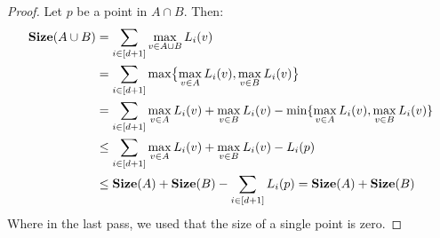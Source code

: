 \begin{proof}
  Let $p$ be a point in $A\cap B$. Then: 
  \begin{equation*}
    \begin{split}
      \mathbf{Size}(A\cup B) &= \sum_{i \in [d+1]}\max_{v \in A\cup B} L_{i}(v) \\
      & =  \sum_{ i \in [d+1]} \max \bigl\{ \max_{v \in A } L_{i}(v) , \max_{v \in B } L_{i}(v) \bigr\}  \\
      & =  \sum_{ i \in [d+1]}  \max_{v \in A } L_{i}(v) + \max_{v \in B } L_{i}(v) -  \min \{   \max_{v \in A } L_{i}(v), \max_{v \in B } L_{i}(v) \} \\
      & \le  \sum_{ i \in [d+1]}  \max_{v \in A } L_{i}(v) + \max_{v \in B } L_{i}(v) -  L_{i}(p)  \\
      & \le \mathbf{Size}(A) + \mathbf{Size}(B)   - \sum_{ i \in [d+1]}  L_{i}(p)  =  \mathbf{Size}(A) + \mathbf{Size}(B) 
    \end{split}
  \end{equation*}
Where in the last pass, we used that the size of a single point is zero.
\end{proof}





